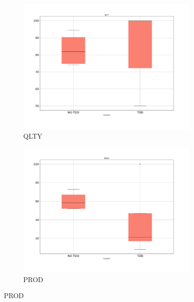 \begin{figure}[htbp]
    \centering
    \begin{subfigure}{0.5\textwidth}
        \includegraphics[width=\linewidth]{figures/box_plots/task2/QLTY.png}
        \caption{QLTY}
        \label{bp_task2_qlty}
    \end{subfigure}\hfil
    \begin{subfigure}{0.5\textwidth}
        \includegraphics[width=\linewidth]{figures/box_plots/task2/PROD.png}
        \caption{PROD}
        \label{bp_task2_prod}
    \end{subfigure}

    \medskip


\end{figure}

